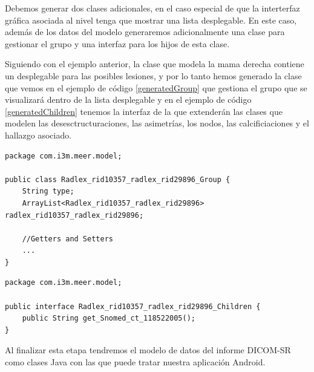 Debemos generar dos clases adicionales, en el caso especial de que la interterfaz gráfica asociada al nivel tenga que mostrar una lista desplegable. En este caso, además de los datos del modelo generaremos adicionalmente una clase para gestionar el grupo y una interfaz para los hijos de esta clase.\par
Siguiendo con el ejemplo anterior, la clase que modela la mama derecha contiene un desplegable para las posibles lesiones, y por lo tanto hemos generado la clase que vemos en el ejemplo de código \ref{generatedGroup} que gestiona el grupo que se visualizará dentro de la  lista desplegable y en el ejemplo de código \ref{generatedChildren} tenemos la interfaz de la que extenderán las clases que modelen las desesctructuraciones, las asimetrías, los nodos, las calcificiaciones y el hallazgo asociado.\par

\begin{lstlisting}[label=generatedGroup,caption=Clase generada automáticamente para tratar con el grupo de una lista desplegable]
package com.i3m.meer.model;

public class Radlex_rid10357_radlex_rid29896_Group {
    String type;
    ArrayList<Radlex_rid10357_radlex_rid29896> radlex_rid10357_radlex_rid29896;

    //Getters and Setters
    ...
}
\end{lstlisting}

\begin{lstlisting}[label=generatedChildren,caption=Interfaz generada automáticamente para gestionar lista desplegable]
package com.i3m.meer.model;

public interface Radlex_rid10357_radlex_rid29896_Children {
    public String get_Snomed_ct_118522005();
}
\end{lstlisting}

Al finalizar esta etapa tendremos el modelo de datos del informe DICOM-SR como clases Java con las que puede tratar nuestra aplicación Android.\par

